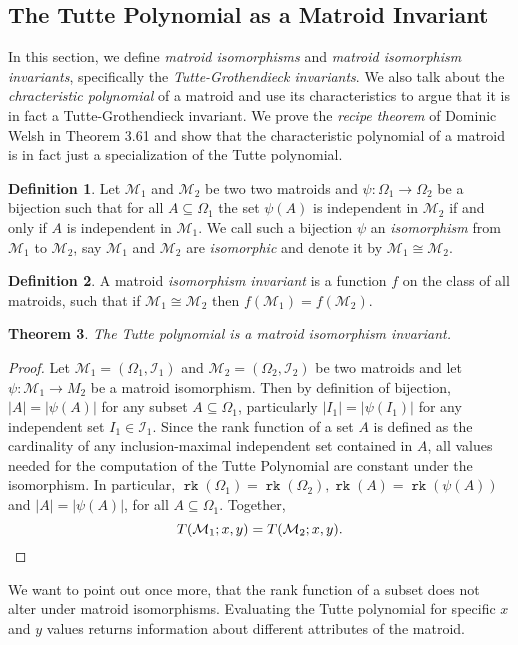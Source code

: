 \documentclass[12pt,a4paper, twoside, autooneside=false]{scrartcl}
\newtheorem{theorem}{Theorem}[section]
\theoremstyle{definition}
\newtheorem{definition}[theorem]{Definition}
\theoremstyle{remark}
\numberwithin{equation}{section}
\DeclareMathOperator{\rk}{\mathtt{rk}}
\newcommand{\M}{\mathcal{M}} %
\begin{document}
\subsection{The Tutte Polynomial as a Matroid Invariant}
In this section, we define \textit{matroid isomorphisms} and \textit{matroid isomorphism invariants}, specifically the \textit{Tutte-Grothendieck invariants}. We also talk about the \textit{chracteristic polynomial} of a matroid and use its characteristics to argue that it is in fact a Tutte-Grothendieck invariant. We prove the \textit{recipe theorem} of Dominic Welsh in Theorem 3.61 and show that the characteristic polynomial of a matroid is in fact just a specialization of the Tutte polynomial.
\begin{definition}
Let $\M_1$ and $\M_2$ be two two matroids and $\psi: \Omega_1 \to \Omega_2$ be a bijection such that for all $A \subseteq \Omega_1$ the set $\psi(A)$ is independent in $\M_2$ if and only if $A$ is independent in $\M_1$. We call such a bijection $\psi$ an \textit{isomorphism} from $\M_1$ to $\M_2$, say $\M_1$ and $\M_2$ are \textit{isomorphic} and denote it by $\M_1 \cong \M_2$.
\end{definition}
\begin{definition}
A matroid \textit{isomorphism invariant} is a function $f$ on the class of all matroids, such that if $\M_1 \cong \M_2$ then $f(\M_1) = f(\M_2)$.
\end{definition}
\begin{theorem}
The Tutte polynomial is a matroid isomorphism invariant.
\end{theorem}
\begin{proof}
Let $\M_1 = (\Omega_1, \mathcal{I}_1)$ and $\M_2 = (\Omega_2, \mathcal{I}_2)$ be two matroids and let $\psi: \M_1 \to M_2$ be a matroid isomorphism. Then by definition of bijection, $|A| = |\psi(A)|$ for any subset $A \subseteq \Omega_1$, particularly $|I_1| = |\psi(I_1)|$ for any independent set $I_1 \in \mathcal{I}_1$. Since the rank function of a set $A$ is defined as the cardinality of any inclusion-maximal independent set contained in $A$, all values needed for the computation of the Tutte Polynomial are constant under the isomorphism. In particular, $\rk(\Omega_1) = \rk(\Omega_2), \rk(A) = \rk(\psi(A))$ and $|A| = |\psi(A)|$, for all $A \subseteq \Omega_1$. Together, 
\[
T(\M_1;x,y) = T(\M_2; x,y). \qedhere
\]
\end{proof}
We want to point out once more, that the rank function of a subset does not alter under matroid isomorphisms. Evaluating the Tutte polynomial for specific $x$ and $y$ values returns information about different attributes of the matroid.
\end{document}
